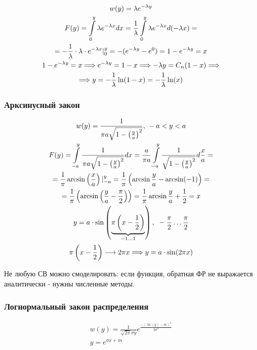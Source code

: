 \documentclass[14pt,a4paper,oneside]{extarticle}
\begin{document}
\begin{gather*}
    w(y)=\lambda e^{-\lambda y}\\
    F(y)=\int\displaylimits_{0}^{y}\lambda e^{-\lambda x}dx=\frac{1}{\lambda}\int\displaylimits_{0}^{y}\lambda e^{-\lambda x}d(-\lambda x)=\\
    =-\frac{1}{\lambda}\cdot\lambda\cdot e^{-\lambda x}|_0^y=-(e^{-\lambda y}-e^0)=1-e^{-\lambda y}=x \\
    1-e^{-\lambda y}=x\Longrightarrow e^{-\lambda y}=1-x\Longrightarrow -\lambda y= C_n(1-x)\Longrightarrow\\
    \Longrightarrow y=-\frac{1}{\lambda}\ln(1-x)=-\frac{1}{\lambda}\ln(x)
\end{gather*}

\subsubsection{Арксинусный закон}

\begin{gather*}
    w(y)=\frac{1}{\pi a\sqrt{1-\left(\frac{y}{a}\right)^2 }}\text{, } -a<y<a\\
    F(y)=\int\displaylimits_{-a}^{y}\frac{1}{\pi a\sqrt{1-\left(\frac{y}{a}\right)^2 }}dx=\frac{a}{\pi a}\int\displaylimits_{-a}^{y}\frac{1}{\sqrt{1-\left(\frac{y}{a}\right)^2 }}d\frac{x}{a}=\\
    =\frac{1}{\pi}\arcsin\left(\frac{x}{a}\right)|_{-a}^{y}=\frac{1}{\pi}\left(\arcsin\frac{y}{a}-\arcsin(-1)\right)=\\
    =\frac{1}{\pi}\left(\arcsin\left(\frac{y}{a}-\frac{\pi}{2}\right)\right)=\frac{1}{\pi}\arcsin\frac{y}{a}+\frac{1}{2}=x\\
    y=a\cdot\sin\left(\underbrace{\pi\left(x-\frac{1}{2}\right) }_{-1\ldots1} \right),\text{ } -\frac{\pi}{2}\ldots\frac{\pi}{2}\\
    \pi\left(x-\frac{1}{2}\right) \longrightarrow 2\pi x \Longrightarrow y=a\cdot\sin(2\pi x)
\end{gather*}

Не любую СВ можно смоделировать: если функция, обратная ФР не выражается аналитически - нужны численные методы.

\subsubsection{Логнормальный закон распределения}

\begin{gather*}
    w(y)=\frac{1}{\sqrt{2\pi}\sigma y}e^{\frac{-(\ln(y)-m)^2}{2\sigma^2}}\\
    y=e^{\sigma x+m}
\end{gather*}
\end{document}
